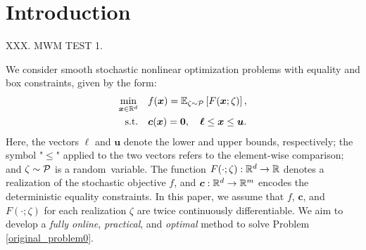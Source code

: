 \documentclass[aos]{imsart}
\numberwithin{equation}{section}
\theoremstyle{plain}
\begin{document}
\begin{frontmatter}

\begin{keyword}
\end{keyword}

\end{frontmatter}




\section{Introduction}

XXX.  MWM TEST 1.

We consider smooth stochastic nonlinear optimization problems with equality and box constraints, given by the form:
\begin{equation}\label{original_problem0}
	\begin{split}
		\min_{\bm{x} \in \mathbb{R}^{d}} & \hspace{1em} f(\bm{x}) = \mathbb{E}_{\zeta \sim \P} \left[ F(\bm{x}; \zeta) \right], \\
		\text{s.t.} & \hspace{1em} \bm{c}(\bm{x}) = \bm{0},\quad \bm{\ell} \leq \bm{x} \leq \bm{u}.
	\end{split}
\end{equation}
Here, the vectors $\bm{\ell}$ and $\bm{u}$ denote the lower and upper bounds, respectively; the symbol "$\leq$" applied to the two vectors refers to the element-wise comparison; and $\zeta\sim\P$ is a random~variable. The function $F(\cdot; \zeta):\mR^d\rightarrow \mR$ denotes a realization of the stochastic objective $f$, and $\bm{c}:\mR^d\rightarrow\mR^m$ encodes the deterministic equality constraints. In this paper, we assume that $f$, $\bm{c}$, and $F(\cdot; \zeta)$ for each realization $\zeta$ are twice continuously differentiable. We aim to develop a \textit{fully online}, \textit{practical}, and \textit{optimal} method to solve Problem \eqref{original_problem0}.
\end{document}
